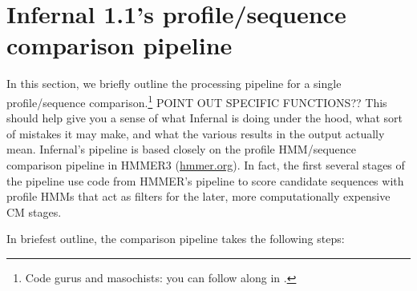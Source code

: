 \section{Infernal 1.1's profile/sequence comparison pipeline}
\label{section:pipeline}
\setcounter{footnote}{0}

In this section, we briefly outline the processing pipeline for a
single profile/sequence comparison.\footnote{Code gurus and
masochists: you can follow along in .} POINT
OUT SPECIFIC FUNCTIONS??  This
should help give you a sense of what Infernal is doing under the hood,
what sort of mistakes it may make, and what the various results in the
output actually mean. Infernal's pipeline is based closely on the
profile HMM/sequence comparison pipeline in HMMER3
(\url{hmmer.org}). In fact, the first several stages of the
pipeline use code from HMMER's pipeline to score candidate sequences
with profile HMMs that act as filters for the later, more
computationally expensive CM stages.

In briefest outline, the comparison pipeline takes the following
steps:

